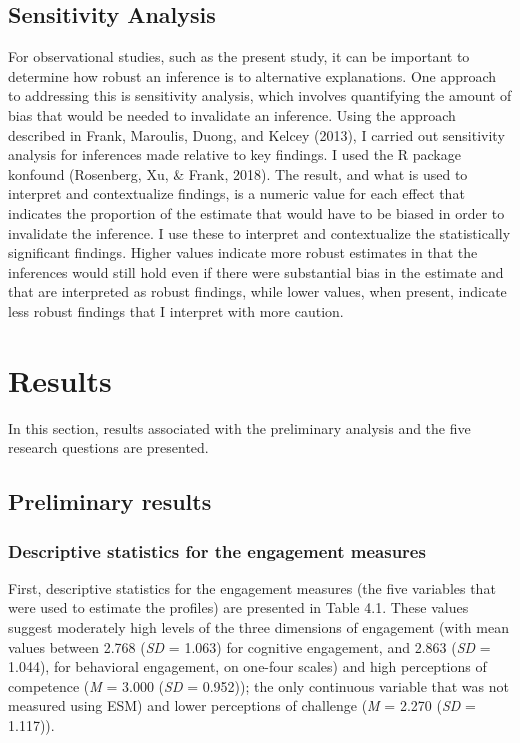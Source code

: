 \documentclass[]{book}
\theoremstyle{definition}
\theoremstyle{definition}
\theoremstyle{definition}
\theoremstyle{remark}
\begin{document}
\section{Sensitivity Analysis}\label{sensitivity-analysis}

For observational studies, such as the present study, it can be
important to determine how robust an inference is to alternative
explanations. One approach to addressing this is sensitivity analysis,
which involves quantifying the amount of bias that would be needed to
invalidate an inference. Using the approach described in Frank,
Maroulis, Duong, and Kelcey (2013), I carried out sensitivity analysis
for inferences made relative to key findings. I used the R package
konfound (Rosenberg, Xu, \& Frank, 2018). The result, and what is used
to interpret and contextualize findings, is a numeric value for each
effect that indicates the proportion of the estimate that would have to
be biased in order to invalidate the inference. I use these to interpret
and contextualize the statistically significant findings. Higher values
indicate more robust estimates in that the inferences would still hold
even if there were substantial bias in the estimate and that are
interpreted as robust findings, while lower values, when present,
indicate less robust findings that I interpret with more caution.

\chapter{Results}\label{results}

In this section, results associated with the preliminary analysis and
the five research questions are presented.

\section{Preliminary results}\label{preliminary-results}

\subsection{Descriptive statistics for the engagement
measures}\label{descriptive-statistics-for-the-engagement-measures}

First, descriptive statistics for the engagement measures (the five
variables that were used to estimate the profiles) are presented in
Table 4.1. These values suggest moderately high levels of the three
dimensions of engagement (with mean values between 2.768 (\emph{SD} =
1.063) for cognitive engagement, and 2.863 (\emph{SD} = 1.044), for
behavioral engagement, on one-four scales) and high perceptions of
competence (\emph{M} = 3.000 (\emph{SD} = 0.952)); the only continuous
variable that was not measured using ESM) and lower perceptions of
challenge (\emph{M} = 2.270 (\emph{SD} = 1.117)).
\end{document}
